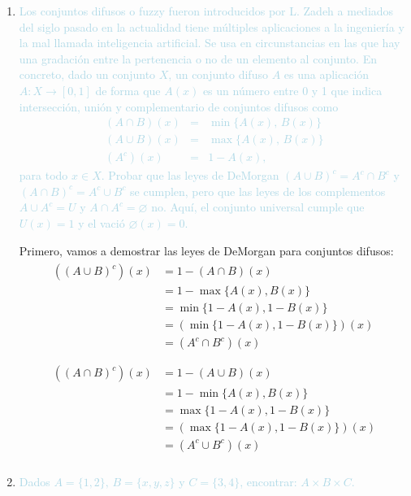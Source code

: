 \documentclass{article}
\newcommand{\lb}[1]{\textcolor{lightblue}{#1}}
\begin{document}
\begin{enumerate}[label=\color{red}\textbf{\arabic*)},leftmargin=*]
\begin{enumerate}[label=\color{red}\alph*)]
      \end{enumerate}
      \item \lb{Los conjuntos difusos o fuzzy fueron introducidos por L. Zadeh a mediados del siglo pasado en la actualidad tiene múltiples aplicaciones a la ingeniería y la mal llamada inteligencia artificial. Se usa en circunstancias en las que hay una gradación entre la pertenencia o no de un elemento al conjunto. En concreto, dado un conjunto $X$, un conjunto difuso $A$ es una aplicación $A:X\longrightarrow [0,1]$ de forma que $A(x)$ es un número entre 0 y 1 que indica intersección, unión y complementario de conjuntos difusos como \[ \begin{array}{rcl}
      		(A\cap B)(x) & = & \min\{A(x),\,B(x)\}\\
      		(A\cup B)(x) & = & \max\{A(x),\,B(x)\}\\
      		(A^c)(x) & = & 1-A(x),
      	\end{array} \]para todo $x\in X$. Probar que las leyes de DeMorgan $(A\cup B)^c=A^c\cap B^c$ y $(A\cap B)^c=A^c\cup B^c$ se cumplen, pero que las leyes de los complementos $A\cup A^c=U$ y $A\cap A^c=\varnothing$ no. Aquí, el conjunto universal cumple que $U(x)=1$ y el vació $\varnothing(x)=0$.}
      
      Primero, vamos a demostrar las leyes de DeMorgan para conjuntos difusos:
      \[ \begin{array}{l}
      	\begin{aligned}
      		\left((A\cup B)^c\right)(x)&=1-\left(A\cap B\right)(x)\\
      		&=1-\max\{A(x),B(x)\}\\
      		&=\min\{1-A(x),1-B(x)\}\\
      		&=\left(\min\{1-A(x),1-B(x)\}\right)(x)\\
      		&=(A^c\cap B^c)(x)
      	\end{aligned}\\
      	\\
      	\begin{aligned}
      		\left((A\cap B)^c\right)(x)&=1-\left(A\cup B\right)(x)\\
      		&=1-\min\{A(x),B(x)\}\\
      		&=\max\{1-A(x),1-B(x)\}\\
      		&=\left(\max\{1-A(x),1-B(x)\}\right)(x)\\
      		&=(A^c\cup B^c)(x)
      	\end{aligned}\\
      \end{array} \]
      \item \lb{Dados $A=\{1,2\},\,B=\{x,y,z\}$ y $C=\{3,4\}$, encontrar: $A\times B\times C$.}
      

\end{enumerate}
\end{document}

